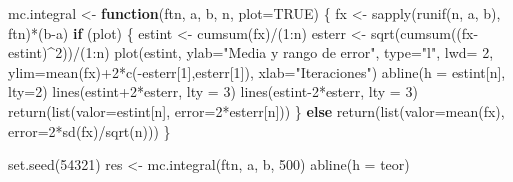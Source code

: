 \documentclass[
]{book}
\newenvironment{Shaded}{\begin{snugshade}}{\end{snugshade}}
\newcommand{\AttributeTok}[1]{\textcolor[rgb]{0.77,0.63,0.00}{#1}}
\newcommand{\ConstantTok}[1]{\textcolor[rgb]{0.00,0.00,0.00}{#1}}
\newcommand{\ControlFlowTok}[1]{\textcolor[rgb]{0.13,0.29,0.53}{\textbf{#1}}}
\newcommand{\DecValTok}[1]{\textcolor[rgb]{0.00,0.00,0.81}{#1}}
\newcommand{\FunctionTok}[1]{\textcolor[rgb]{0.00,0.00,0.00}{#1}}
\newcommand{\NormalTok}[1]{#1}
\newcommand{\OtherTok}[1]{\textcolor[rgb]{0.56,0.35,0.01}{#1}}
\newcommand{\SpecialCharTok}[1]{\textcolor[rgb]{0.00,0.00,0.00}{#1}}
\newcommand{\StringTok}[1]{\textcolor[rgb]{0.31,0.60,0.02}{#1}}
\theoremstyle{break}
\theoremstyle{definition}
\theoremstyle{definition}
\theoremstyle{definition}
\theoremstyle{definition}
\theoremstyle{remark}
\begin{document}
\begin{Shaded}
\begin{Highlighting}[]
\NormalTok{mc.integral }\OtherTok{\textless{}{-}} \ControlFlowTok{function}\NormalTok{(ftn, a, b, n, }\AttributeTok{plot=}\ConstantTok{TRUE}\NormalTok{) \{}
\NormalTok{  fx }\OtherTok{\textless{}{-}} \FunctionTok{sapply}\NormalTok{(}\FunctionTok{runif}\NormalTok{(n, a, b), ftn)}\SpecialCharTok{*}\NormalTok{(b}\SpecialCharTok{{-}}\NormalTok{a)}
  \ControlFlowTok{if}\NormalTok{ (plot) \{}
\NormalTok{    estint }\OtherTok{\textless{}{-}} \FunctionTok{cumsum}\NormalTok{(fx)}\SpecialCharTok{/}\NormalTok{(}\DecValTok{1}\SpecialCharTok{:}\NormalTok{n)}
\NormalTok{    esterr }\OtherTok{\textless{}{-}} \FunctionTok{sqrt}\NormalTok{(}\FunctionTok{cumsum}\NormalTok{((fx}\SpecialCharTok{{-}}\NormalTok{estint)}\SpecialCharTok{\^{}}\DecValTok{2}\NormalTok{))}\SpecialCharTok{/}\NormalTok{(}\DecValTok{1}\SpecialCharTok{:}\NormalTok{n)}
    \FunctionTok{plot}\NormalTok{(estint, }\AttributeTok{ylab=}\StringTok{"Media y rango de error"}\NormalTok{, }\AttributeTok{type=}\StringTok{"l"}\NormalTok{, }\AttributeTok{lwd=} \DecValTok{2}\NormalTok{, }
         \AttributeTok{ylim=}\FunctionTok{mean}\NormalTok{(fx)}\SpecialCharTok{+}\DecValTok{2}\SpecialCharTok{*}\FunctionTok{c}\NormalTok{(}\SpecialCharTok{{-}}\NormalTok{esterr[}\DecValTok{1}\NormalTok{],esterr[}\DecValTok{1}\NormalTok{]), }\AttributeTok{xlab=}\StringTok{"Iteraciones"}\NormalTok{)}
    \FunctionTok{abline}\NormalTok{(}\AttributeTok{h =}\NormalTok{ estint[n], }\AttributeTok{lty=}\DecValTok{2}\NormalTok{)}
    \FunctionTok{lines}\NormalTok{(estint}\SpecialCharTok{+}\DecValTok{2}\SpecialCharTok{*}\NormalTok{esterr, }\AttributeTok{lty =} \DecValTok{3}\NormalTok{)}
    \FunctionTok{lines}\NormalTok{(estint}\DecValTok{{-}2}\SpecialCharTok{*}\NormalTok{esterr, }\AttributeTok{lty =} \DecValTok{3}\NormalTok{)}
    \FunctionTok{return}\NormalTok{(}\FunctionTok{list}\NormalTok{(}\AttributeTok{valor=}\NormalTok{estint[n], }\AttributeTok{error=}\DecValTok{2}\SpecialCharTok{*}\NormalTok{esterr[n]))  }
\NormalTok{  \} }\ControlFlowTok{else} \FunctionTok{return}\NormalTok{(}\FunctionTok{list}\NormalTok{(}\AttributeTok{valor=}\FunctionTok{mean}\NormalTok{(fx), }\AttributeTok{error=}\DecValTok{2}\SpecialCharTok{*}\FunctionTok{sd}\NormalTok{(fx)}\SpecialCharTok{/}\FunctionTok{sqrt}\NormalTok{(n)))}
\NormalTok{\}  }

\FunctionTok{set.seed}\NormalTok{(}\DecValTok{54321}\NormalTok{)}
\NormalTok{res }\OtherTok{\textless{}{-}} \FunctionTok{mc.integral}\NormalTok{(ftn, a, b, }\DecValTok{500}\NormalTok{)}
\FunctionTok{abline}\NormalTok{(}\AttributeTok{h =}\NormalTok{ teor)}
\end{Highlighting}
\end{Shaded}
\end{document}
